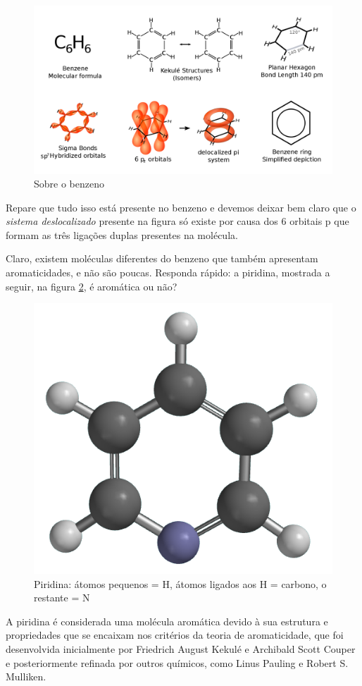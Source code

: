 \documentclass[a4paper,12pt]{book}
\begin{document}
\begin{figure}[h]
	\centering
	\caption{Sobre o benzeno}
	\label{fig:nenzenodetalhes}
	\includegraphics[width=1\linewidth]{imagens/benzeno_detalhes.png}
\end{figure}

Repare que tudo isso está presente no benzeno e devemos deixar bem claro que o \emph{sistema deslocalizado} presente na figura só existe por causa dos 6 orbitais p que formam as três ligações duplas presentes na molécula.

Claro, existem moléculas diferentes do benzeno que também apresentam aromaticidades, e não são poucas. Responda rápido: a piridina, mostrada a seguir, na figura \ref{fig:piridina}, é aromática ou não?

\begin{figure}[h]
	\centering
	\caption{Piridina: átomos pequenos = H, átomos ligados aos H = carbono, o restante = N}
	\label{fig:piridina}
	\includegraphics[width=0.45\linewidth]{imagens/pyridine03.png}
\end{figure}

A piridina é considerada uma molécula aromática devido à sua estrutura e propriedades que se encaixam nos critérios da teoria de aromaticidade, que foi desenvolvida inicialmente por Friedrich August Kekulé e Archibald Scott Couper e posteriormente refinada por outros químicos, como Linus Pauling e Robert S. Mulliken.
\end{document}

